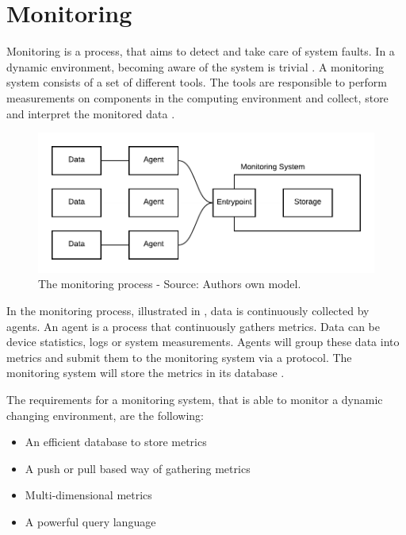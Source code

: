 \section{Monitoring}
\label{sec:02_monitoring}
Monitoring is a process, that aims to detect and take care of system faults. In a dynamic environment, becoming aware of the system is trivial \cite{Ligus2012EffMonitoring}.
A monitoring system consists of a set of different tools. The tools are responsible to perform measurements on components in the computing environment and collect, store and interpret the monitored data \cite{Ligus2012EffMonitoring}. 


\begin{figure}[h]
\centering
\includegraphics[scale=0.9]{images/02_theoretical_foundation/monitoring/monitoring_system}
\caption{The monitoring process - Source: Authors own model.}
\label{fig:mon_mon-system-process}
\end{figure}
In the monitoring process, illustrated in , data is continuously collected by agents. An agent is a process that continuously gathers metrics. Data can be device statistics, logs or system measurements. Agents will group these data into metrics and submit them to the monitoring system via a protocol. The monitoring system will store the metrics in its database \cite{Ligus2012EffMonitoring}.


The requirements for a monitoring system, that is able to monitor a dynamic changing environment, are the following:
\begin{itemize}
\item An efficient database to store metrics
\item A push or pull based way of gathering metrics \cite{Farcic2017Toolkit21}
\item Multi-dimensional metrics \cite{Farcic2017Toolkit21}
\item A powerful query language \cite{Farcic2017Toolkit21}
\end{itemize}


